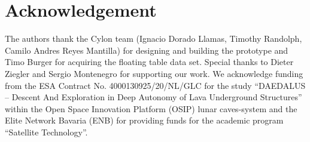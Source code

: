 \section*{Acknowledgement}

The authors thank the Cylon team (Ignacio Dorado Llamas, Timothy Randolph, Camilo Andres Reyes Mantilla) for designing and building the prototype and Timo Burger for acquiring the floating table data set.
Special thanks to Dieter Ziegler and Sergio Montenegro for supporting our work.
We acknowledge funding from the ESA Contract No. 4000130925/20/NL/GLC for the study ``DAEDALUS -- Descent And Exploration in Deep Autonomy of Lava Underground Structures'' within the Open Space Innovation Platform (OSIP) lunar caves-system and the Elite Network Bavaria (ENB) for providing funds for the academic program ``Satellite Technology''.
